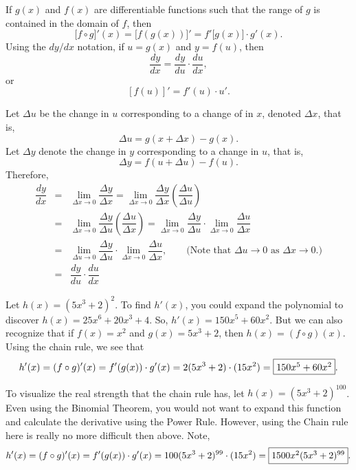 \documentclass{book}
\begin{document}
\begin{Thm} If $g(x)$ and $f(x)$ are differentiable functions such that the range of $g$ is contained in the domain of $f$, then 
\[\big[f\circ g\big]'(x) = \big[f(g(x))\big]' = f'\big[g(x)\big]\cdot g'(x).\]
 Using the $dy/dx$ notation, if $u=g(x)$ and $y = f(u)$, then 
\[\dfrac{dy}{dx} = \dfrac{dy}{du} \cdot \dfrac{du}{dx}, \]
or
\[ [f(u)]' = f'(u)\cdot u'.\]
\end{Thm}
\begin{pf}
Let $\Delta u$ be the change in $u$ corresponding to a change of in $x$, denoted  $\Delta x$, that is, \[\Delta u = g(x+\Delta x)-g(x).\] Let $\Delta y$ denote the change in $y$ corresponding to a change in $u$, that is, \[\Delta y = f(u+\Delta u)-f(u).\] Therefore, 
\begin{eqnarray*}
\dfrac{dy}{dx} &=& \lim_{\Delta x \to 0} \dfrac{\Delta y}{\Delta x} = \lim_{\Delta x \to 0} \dfrac{\Delta y}{\Delta x}\left(\dfrac{\Delta u}{\Delta u}\right)\\
&=& \lim_{\Delta x \to 0} \dfrac{\Delta y}{\Delta u}\left(\dfrac{\Delta u}{\Delta x}\right) = \lim_{\Delta x \to 0} \dfrac{\Delta y}{\Delta u}\cdot \lim_{\Delta x \to 0}\dfrac{\Delta u}{\Delta x}\\
&=&  \lim_{\Delta u \to 0} \dfrac{\Delta y}{\Delta u}\cdot \lim_{\Delta x \to 0}\dfrac{\Delta u}{\Delta x},\qquad\text{(Note that $\Delta u \to 0$ as $\Delta x \to 0$.)}\\
&=& \dfrac{dy}{du}\cdot \dfrac{du}{dx}
\end{eqnarray*}
\end{pf}\vs

\begin{Exam} Let $h(x) = (5x^3+2)^2$. To find $h'(x)$, you could expand the polynomial to discover $h(x) = 25x^6 + 20x^3 + 4$. So, $h'(x) = 150x^5 + 60x^2$. But we can also recognize that if $f(x) = x^2$ and $g(x) = 5x^3+2$, then $h(x) = (f\circ g)(x)$. Using the chain rule, we see that 
\[h'(x) = (f\circ g)'(x) = f'(g(x))\cdot g'(x) = 2(5x^3+2)\cdot (15x^2) = \fbox{$150x^5 + 60x^2$}. \]\vs

To visualize the real strength that the chain rule has, let $h(x) = (5x^3+2)^{100}$. Even using the Binomial Theorem, you would not want to expand this function and calculate the derivative using the Power Rule. However, using the Chain rule here is really no more difficult then above. Note,
\[h'(x) = (f\circ g)'(x) = f'(g(x))\cdot g'(x) = 100(5x^3+2)^{99}\cdot (15x^2) = \fbox{$1500x^2(5x^3+2)^{99}$}.\]
\end{Exam}\vs
\end{document}
